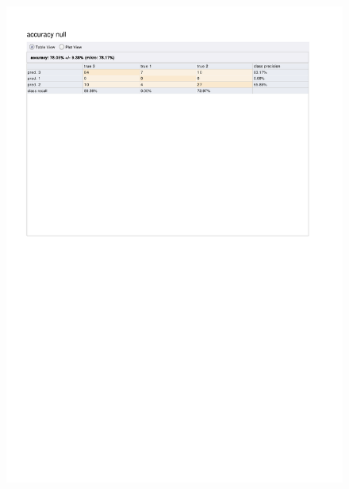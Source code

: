\begin{figure}[htp]
  \centerline{\includegraphics[trim=0 680 0 80,clip,width=16.09cm]{results/ANN_A_Frustration.pdf}} \caption{
} \label{ANN_K_Frustration}
\end{figure}

